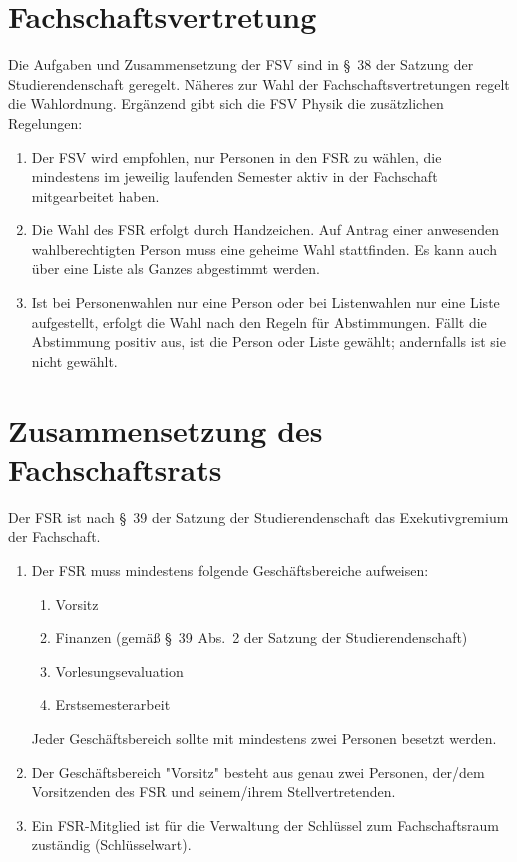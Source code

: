 \section{Fachschaftsvertretung}
Die Aufgaben und Zusammensetzung der FSV sind in §~38 der Satzung der Studierendenschaft geregelt.
Näheres zur Wahl der Fachschaftsvertretungen regelt die Wahlordnung.
Ergänzend gibt sich die FSV Physik die zusätzlichen Regelungen:
\begin{enumerate}
	\item Der FSV wird empfohlen, nur Personen in den FSR zu wählen, die mindestens im jeweilig laufenden Semester aktiv in der Fachschaft mitgearbeitet haben.
	\item Die Wahl des FSR erfolgt durch Handzeichen.
	Auf Antrag einer anwesenden wahlberechtigten Person muss eine geheime Wahl stattfinden.
	Es kann auch über eine Liste als Ganzes abgestimmt werden.
	\item Ist bei Personenwahlen nur eine Person oder bei Listenwahlen nur eine Liste aufgestellt, erfolgt die Wahl nach den Regeln für Abstimmungen.
	Fällt die Abstimmung positiv aus, ist die Person oder Liste gewählt; andernfalls ist sie nicht gewählt.
\end{enumerate}

\section{Zusammensetzung des Fachschaftsrats}
Der FSR ist nach §~39 der Satzung der Studierendenschaft das Exekutivgremium der Fachschaft.
\begin{enumerate}
	\item Der FSR muss mindestens folgende Geschäftsbereiche aufweisen:
	\begin{enumerate}
		\item Vorsitz
		\item Finanzen (gemäß §~39 Abs.~2 der Satzung der Studierendenschaft)
		\item Vorlesungsevaluation
		\item Erstsemesterarbeit
	\end{enumerate}
	Jeder Geschäftsbereich sollte mit mindestens zwei Personen besetzt werden.
	\item Der Geschäftsbereich "Vorsitz" besteht aus genau zwei Personen, der/dem Vorsitzenden des FSR und seinem/ihrem Stellvertretenden.
	\item Ein FSR-Mitglied ist für die Verwaltung der Schlüssel zum Fachschaftsraum zuständig (Schlüsselwart).
\end{enumerate}

